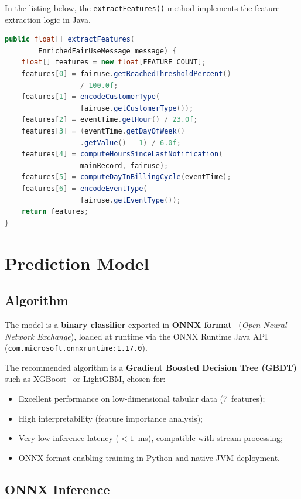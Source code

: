 In the listing below, the \texttt{extractFeatures()} method implements the feature extraction logic in Java.


\begin{lstlisting}[language=Java, caption={Feature extraction (PredictionFeatureExtractor.java)}, breaklines=true]
public float[] extractFeatures(
        EnrichedFairUseMessage message) {
    float[] features = new float[FEATURE_COUNT];
    features[0] = fairuse.getReachedThresholdPercent()
                  / 100.0f;
    features[1] = encodeCustomerType(
                  fairuse.getCustomerType());
    features[2] = eventTime.getHour() / 23.0f;
    features[3] = (eventTime.getDayOfWeek()
                  .getValue() - 1) / 6.0f;
    features[4] = computeHoursSinceLastNotification(
                  mainRecord, fairuse);
    features[5] = computeDayInBillingCycle(eventTime);
    features[6] = encodeEventType(
                  fairuse.getEventType());
    return features;
}
\end{lstlisting}


\section{Prediction Model}

\subsection{Algorithm}

The model is a \textbf{binary classifier} exported in \textbf{ONNX format}~\cite{onnx} (\textit{Open Neural Network Exchange}), loaded at runtime via the ONNX Runtime Java API~\cite{onnxruntime} (\texttt{com.microsoft.onnxruntime:1.17.0}).

The recommended algorithm is a \textbf{Gradient Boosted Decision Tree (GBDT)} such as XGBoost~\cite{xgboost} or LightGBM, chosen for:
\begin{itemize}
    \item Excellent performance on low-dimensional tabular data (7~features);
    \item High interpretability (feature importance analysis);
    \item Very low inference latency ($< 1$~ms), compatible with stream processing;
    \item ONNX format enabling training in Python and native JVM deployment.
\end{itemize}

\subsection{ONNX Inference}


